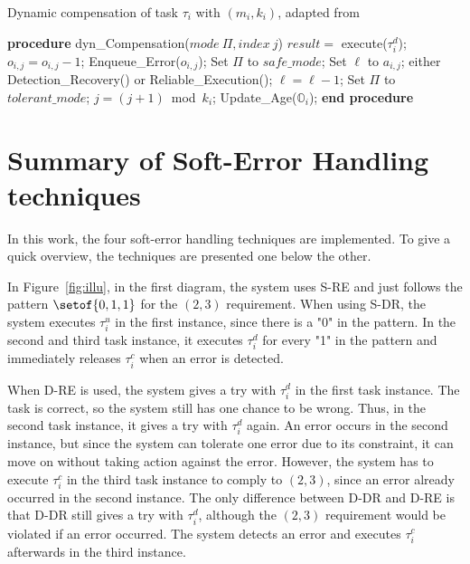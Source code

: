 \begin{algorithm}[h]
\caption{Dynamic compensation of task $\tau_i$ with $(m_i,k_i)$, adapted from~\cite{Chen2016}}
  \label{alg:dyn}
  \begin{algorithmic}[1]  
 
  \STATE \textbf{procedure} dyn\_Compensation($ mode~\Pi, index ~j$)
	  \STATE $result =$ execute($\tau_i^d$);
  	  	\STATE $o_{i,j}=o_{i,j}-1$;
  	  	\STATE Enqueue\_Error($o_{i,j}$);
	      	\STATE Set $\Pi$ to $safe\_mode$;
	      	\STATE Set $\ell$ to $a_{i,j}$;
		\ENDIF
  	  \ENDIF  	  
  \ELSE
  	  \STATE either Detection\_Recovery() or Reliable\_Execution();
	  \STATE $\ell = \ell-1$;
      	\STATE Set $\Pi$ to $tolerant\_mode$;
      	\STATE $j=(j+1)$~mod~$k_i$;
	  \ENDIF      
  \ENDIF
  \STATE Update\_Age($\mathbb{O}_i$);
  \STATE \textbf{end procedure}
  \end{algorithmic}
\end{algorithm}
\section{Summary of Soft-Error Handling techniques}

In this work, the four soft-error handling techniques are implemented. To give a quick overview, the techniques are presented one below the other. 

In Figure~\ref{fig:illu}, in the first diagram, the system uses S-RE and just follows the pattern $\setof{0,1,1}$ for the $(2,3)$ requirement. When using S-DR, the system executes $\tau_i^u$ in the first instance, since there is a "0" in the pattern. In the second and third task instance, it executes $\tau_i^d$ for every "1" in the pattern and immediately releases $\tau_i^c$ when an error is detected.

When D-RE is used, the system gives a try with $\tau_i^d$ in the first task instance. The task is correct, so the system still has one chance to be wrong. Thus, in the second task instance, it gives a try with $\tau_i^d$ again. An error occurs in the second instance, but since the system can tolerate one error due to its constraint, it can move on without taking action against the error. However, the system has to execute $\tau_i^c$ in the third task instance to comply to $(2,3)$, since an error already occurred in the second instance. 
The only difference between D-DR and D-RE is that D-DR still gives a try with $\tau_i^d$, although the $(2,3)$ requirement would be violated if an error occurred. The system detects an error and executes $\tau_i^c$ afterwards in the third instance.
\vspace{-0.3cm}


